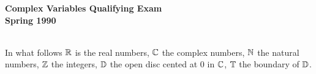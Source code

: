 \documentclass{article}
\begin{document}






\begin{center}\begin{LARGE}
{\bf Complex Variables Qualifying Exam}\\ 
{\bf Spring 1990}\\ \end{LARGE}
\end{center}
\vspace{0.1in}
\noindent\hrulefill\\

In what follows $\Bbb R$ is the real numbers, $\Bbb C$ the complex numbers,
$\Bbb N$ the natural numbers, $\Bbb Z$ the integers, $\Bbb D$ the open
disc cented at 0 in $\Bbb C$, $\Bbb T$ the boundary of $\Bbb D$.
\end{document}
